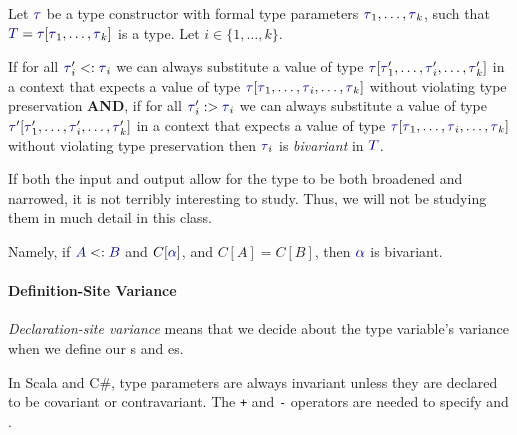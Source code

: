 \begin{definition}[Bivariance]\label{def:Type_Bivariance}
  Let $\DataType$ be a type constructor with formal type parameters $\DataType_{1}, \ldots , \DataType_{k}$, such that $\SemanticType{T} = \DataType [\DataType_{1}, \ldots, \DataType_{k}]$ is a type.
  Let $i \in \lbrace 1,\ldots, k \rbrace$.

  If for all $\DataType_{i}' <: \DataType_{i}$ we can always substitute a value of type $\DataType [\DataType_{1}',\ldots, \DataType_{i}', \ldots, \DataType_{k}']$ in a context that expects a value of type $\DataType [\DataType_{1}, \ldots, \DataType_{i}, \ldots, \DataType_{k}]$ without violating type preservation \textbf{AND}, if for all $\DataType_{i}' :> \DataType_{i}$ we can always substitute a value of type $\DataType' [\DataType_{1}', \ldots, \DataType_{i}', \ldots, \DataType_{k}']$ in a context that expects a value of type $\DataType [\DataType_{1}, \ldots, \DataType_{i}, \ldots, \DataType_{k}]$ without violating type preservation then $\DataType_{i}$ is \emph{bivariant} in $\SemanticType{T}$.

  \begin{remark}
    If both the input and output allow for the type to be both broadened and narrowed, it is not terribly interesting to study.
    Thus, we will not be studying them in much detail in this class.
  \end{remark}

  Namely, if $\SemanticType{A} <: \SemanticType{B}$ and $C[\SemanticType{\alpha}]$, and $C[A] = C[B]$, then $\SemanticType{\alpha}$ is bivariant.
\end{definition}

\paragraph{Definition-Site Variance}\label{par:Definition_Site_Variance}
\begin{definition}\label{def:Definition_Site_Variance}
  \emph{Declaration-site variance} means that we decide about the type variable's variance when we define our s and es.
\end{definition}

In Scala and C\#, type parameters are always invariant unless they are declared to be covariant or contravariant.
The \texttt{+} and \texttt{-} operators are needed to specify  and .
\inputminted[frame=lines,linenos]{scala}{./EDAP05-Concepts_Programming_Languages-Sections/Advanced_Data_Types/Code/Definition_Site_Variance.scala}


